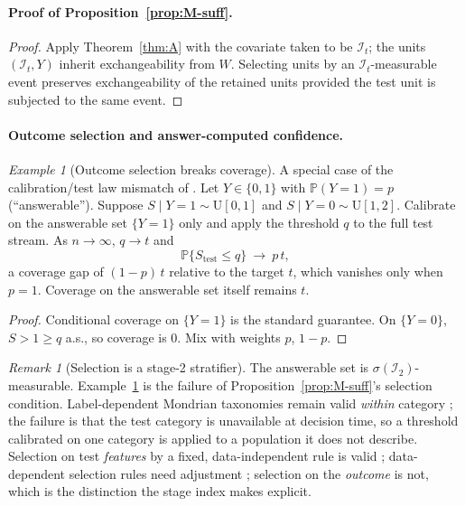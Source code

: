 \documentclass[twoside]{article}
\theoremstyle{definition}
\theoremstyle{remark}
\newtheorem{remark}[theorem]{Remark}
\newtheorem{example}[theorem]{Example}
\newcommand{\Info}{\mathcal{I}}
\renewcommand{\P}{\mathbb{P}}
\newcommand{\1}{\mathbf{1}}
\begin{document}
\paragraph{Proof of Proposition~\ref{prop:M-suff}.}
\begin{proof}
Apply Theorem~\ref{thm:A} with the covariate taken to be $\Info_t$; the units
$(\Info_t, Y)$ inherit exchangeability from $W$. Selecting units by an
$\Info_t$-measurable event preserves exchangeability of the retained units provided the
test unit is subjected to the same event.
\end{proof}

\paragraph{Outcome selection and answer-computed confidence.}
\begin{example}[Outcome selection breaks coverage]
\label{ex:M-fail}
A special case of the calibration/test law mismatch of \citet{wang2026trimming}. Let $Y\in\{0,1\}$ with $\P(Y=1)=p$ (``answerable''). Suppose
$S\mid Y{=}1 \sim \mathrm{U}[0,1]$ and $S\mid Y{=}0 \sim \mathrm{U}[1,2]$.
Calibrate on the answerable set $\{Y=1\}$ only and apply the threshold $q$ to the
full test stream. As $n\to\infty$, $q \to t$ and
\[
  \P\{S_{\mathrm{test}} \le q\} \ \to\ p\,t,
\]
a coverage gap of $(1-p)\,t$ relative to the target $t$,
which vanishes only when $p=1$. Coverage on the answerable set itself remains $t$.
\begin{proof}
Conditional coverage on $\{Y=1\}$ is the standard guarantee. On $\{Y=0\}$, $S>1\ge q$ a.s.,
so coverage is $0$. Mix with weights $p$, $1-p$.
\end{proof}
\end{example}

\begin{remark}[Selection is a stage-2 stratifier]
The answerable set is $\sigma(\Info_2)$-measurable. Example~\ref{ex:M-fail} is the
failure of Proposition~\ref{prop:M-suff}'s selection condition. Label-dependent Mondrian
taxonomies remain valid \emph{within} category \citep{vovk2005algorithmic}; the failure is
that the test category is unavailable at decision time, so a threshold calibrated on one
category is applied to a population it does not describe.
Selection on test \emph{features} by a fixed, data-independent rule is valid
\citep{bao2024selective}; data-dependent selection rules need adjustment \citep{jin2024confidence}; selection
on the \emph{outcome} is not, which is the distinction the stage index makes explicit.
\end{remark}
\end{document}

